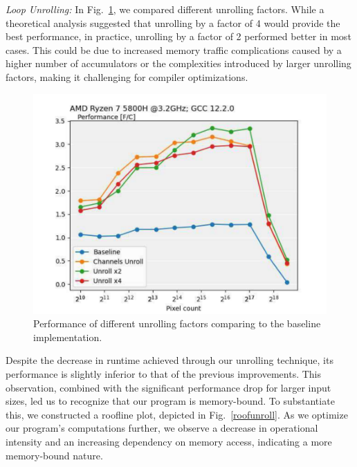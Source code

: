 \documentclass[letterpaper]{article}
\begin{document}
\textit{Loop Unrolling:} In Fig.~\ref{perfUnroll}, we compared different unrolling factors. While a theoretical analysis suggested that unrolling by a factor of 4 would provide the best performance, in practice, unrolling by a factor of 2 performed better in most cases. This could be due to increased memory traffic complications caused by a higher number of accumulators or the complexities introduced by larger unrolling factors, making it challenging for compiler optimizations. 

\begin{figure}[htb]
\centering
  \includegraphics[scale=0.5]{PerfUnroll.pdf}
  \caption{Performance of different unrolling factors comparing to the baseline implementation.
  \label{perfUnroll}}
\end{figure}

Despite the decrease in runtime achieved through our unrolling technique, its performance is slightly inferior to that of the previous improvements. This observation, combined with the significant performance drop for larger input sizes, led us to recognize that our program is memory-bound. To substantiate this, we constructed a roofline plot, depicted in Fig.~\ref{roofunroll}. As we optimize our program's computations further, we observe a decrease in operational intensity and an increasing dependency on memory access, indicating a more memory-bound nature.
\end{document}
